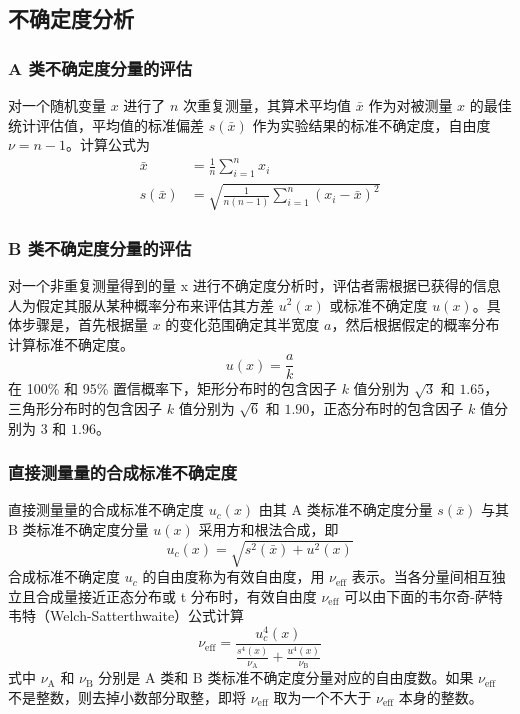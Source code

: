 \subsection{不确定度分析}
    \subsubsection{A 类不确定度分量的评估}
    对一个随机变量 $x$ 进行了 $n$ 次重复测量，其算术平均值 $\bar{x}$ 作为对被测量 $x$ 的最佳统计评估值，平均值的标准偏差 $s(\bar{x})$ 作为实验结果的标准不确定度，自由度 $\nu=n-1$。计算公式为\\
    \begin{align}
        \bar{x}&=\frac{1}{n}\sum_{i=1}^{n}x_i \label{exp:amean} \\
        s(\bar{x})&=\sqrt{\frac{1}{n(n-1)}\sum_{i=1}^{n}(x_i-\bar{x})^2} \label{exp:astd}
    \end{align}

    \subsubsection{B 类不确定度分量的评估}
    对一个非重复测量得到的量 x 进行不确定度分析时，评估者需根据已获得的信息人为假定其服从某种概率分布来评估其方差 $u^2(x)$ 或标准不确定度 $u(x)$。具体步骤是，首先根据量 $x$ 的变化范围确定其半宽度 $a$，然后根据假定的概率分布计算标准不确定度。\\
    \begin{equation}
        u(x) = \frac a k \label{exp:uncertaintyB}
    \end{equation}
    在 100\% 和 95\% 置信概率下，矩形分布时的包含因子 $k$ 值分别为 $\sqrt{3}$ 和 $1.65$，三角形分布时的包含因子 $k$ 值分别为 $\sqrt{6}$ 和 $1.90$，正态分布时的包含因子 $k$ 值分别为 $3$ 和 $1.96$。

    \subsubsection{直接测量量的合成标准不确定度}
    直接测量量的合成标准不确定度 $u_c(x)$ 由其 A 类标准不确定度分量 $s(\bar{x})$ 与其 B 类标准不确定度分量 $u(x)$ 采用方和根法合成，即\\
    \begin{equation}
        u_c(x) = \sqrt{s^2(\bar{x})+u^2(x)} \label{exp:uncertaintyCombine}
    \end{equation}
    合成标准不确定度 $u_c$ 的自由度称为有效自由度，用 $\nu_\text{eff}$ 表示。当各分量间相互独立且合成量接近正态分布或 t 分布时，有效自由度 $\nu_\text{eff}$ 可以由下面的韦尔奇-萨特韦特（Welch-Satterthwaite）公式计算\\
    \begin{equation}
        \nu_\text{eff}=\frac{u_c^4(x)}{\displaystyle\frac{s^4(x)}{\nu_\text{A}}+\frac{u^4(x)}{\nu_\text{B}}} \label{exp:validFreedom}
    \end{equation}
    式中 $\nu_\text{A}$ 和 $\nu_\text{B}$ 分别是 A 类和 B 类标准不确定度分量对应的自由度数。如果 $\nu_\text{eff}$ 不是整数，则去掉小数部分取整，即将 $\nu_\text{eff}$ 取为一个不大于 $\nu_\text{eff}$ 本身的整数。

